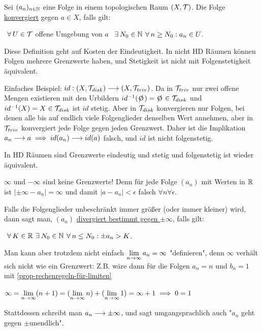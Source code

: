 \begin{definition}
    \label{def-convergence-of-sequence-2}
    Sei $(a_n)_{n \in \mathbb{N}}$ eine Folge in einem topologischen Raum $(X, \mathcal{T})$. Die Folge \underline{konvergiert} gegen $a \in X$, falls gilt:

    $\forall U \in \T$ offene Umgebung von $a$ $ \exists N_0 \in \N \forall n \geq N_0: a_n \in U$.
\end{definition}

Diese Definition geht auf Kosten der Eindeutigkeit. In nicht HD Räumen können Folgen mehrere Grenzwerte haben, und Stetigkeit ist nicht mit Folgenstetigkeit äquivalent.

Einfaches Beispiel: $id: (X, \mathcal{T}_{disk}) \longrightarrow (X, \mathcal{T}_{triv})$. Da in $\mathcal{T}_{triv}$ nur zwei offene Mengen existieren mit den Urbildern $id\m(\e) = \e \in \T_{disk}$ und $id^{-1}(X) = X \in \mathcal{T}_{disk}$ ist $id$ stetig. Aber in $\mathcal{T}_{disk}$ konvergieren nur Folgen, bei denen alle bis auf endlich viele Folgenglieder denselben Wert annehmen, aber in $\mathcal{T}_{triv}$ konvergiert jede Folge gegen jeden Grenzwert. Daher ist die Implikation $a_n \longrightarrow a \implies id(a_n) \longrightarrow id(a)$ falsch, und $id$ ist nicht folgenstetig.

In HD Räumen sind Grenzwerte eindeutig und stetig und folgenstetig ist wieder äquivalent.

\begin{remark}
    $\infty$ und $-\infty$ sind keine Grenzwerte! Denn für jede Folge $(a_n)$ mit Werten in $\mathbb{R}$ ist $|\pm \infty - a_n| = \infty$ und damit $|a - a_n| < \epsilon$ falsch $\forall n \forall \epsilon$.

    Falls die Folgenglieder unbeschränkt immer größer (oder immer kleiner) wird, dann sagt man, $(a_n)$ \underline{divergiert bestimmt gegen $\pm \infty$}, falls gilt:
    
    $\forall K \in \R \exists N_0 \in \N \forall n \leq N_0: \pm a_n > K$.
    
    Man kann aber trotzdem nicht einfach $\lim\limits_{n \rightarrow \infty} a_n = \infty$ "definieren", denn $\infty$ verhält sich nicht wie ein Grenzwert: Z.B. wäre dann für die Folgen $a_n = n$ und $b_n = 1$ mit \ref{prop-rechenregeln-für-limiten}

    $\infty = \lim\limits_{n \rightarrow \infty} (n + 1) = (\lim\limits_{n \rightarrow \infty} n) + (\lim\limits_{n \rightarrow \infty} 1) = \infty + 1 \implies 0 = 1$ \absurdum

    Stattdessen schreibt man $a_n \longrightarrow \pm \infty$, und sagt umgangsprachlich auch "$a_n$ geht gegen $\pm$unendlich".
\end{remark}

